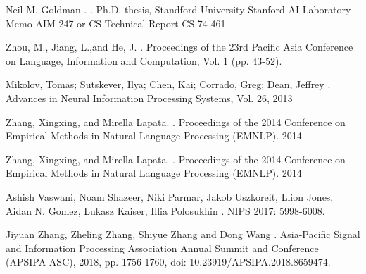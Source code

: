 \documentclass[11pt]{article}
\begin{document}
\begin{thebibliography}{}

Neil M. Goldman
.
.
\newblock Ph.D. thesis, Standford University
\newblock Stanford AI Laboratory Memo AIM-247 or CS Technical Report CS-74-461

Zhou, M., Jiang, L.,and He, J.
.
\newblock Proceedings of the 23rd Pacific Asia Conference on Language, Information and Computation, Vol. 1 (pp. 43-52).

Mikolov, Tomas; Sutskever, Ilya; Chen, Kai; Corrado, Greg; Dean, Jeffrey
.
\newblock Advances in Neural Information Processing Systems, Vol. 26, 2013

Zhang, Xingxing, and Mirella Lapata.
.
\newblock Proceedings of the 2014 Conference on Empirical Methods in Natural Language Processing (EMNLP). 2014

Zhang, Xingxing, and Mirella Lapata.
.
\newblock Proceedings of the 2014 Conference on Empirical Methods in Natural Language Processing (EMNLP). 2014

Ashish Vaswani, Noam Shazeer, Niki Parmar, Jakob Uszkoreit, Llion Jones, Aidan N. Gomez, Lukasz Kaiser, Illia Polosukhin
.
\newblock NIPS 2017: 5998-6008.

Jiyuan Zhang, Zheling Zhang, Shiyue Zhang and Dong Wang
.
\newblock Asia-Pacific Signal and Information Processing Association Annual Summit and Conference (APSIPA ASC), 2018, pp. 1756-1760, doi: 10.23919/APSIPA.2018.8659474. 


\end{thebibliography}
\end{document}
